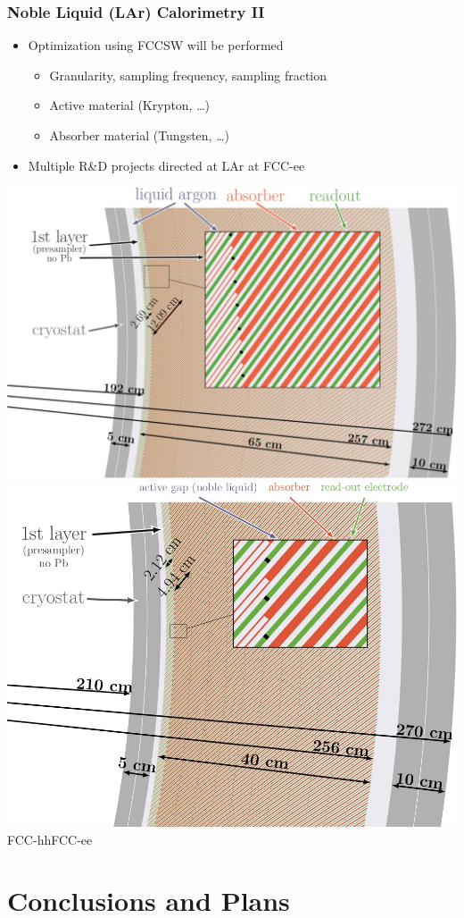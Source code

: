 \documentclass{beamer}
\begin{document}
\begin{frame}
  \frametitle{Noble Liquid (LAr) Calorimetry II}

  \begin{itemize}
    \item Optimization using FCCSW will be performed
          \begin{itemize}
            \item Granularity, sampling frequency, sampling fraction
            \item Active material (Krypton, \dots)
            \item Absorber material (Tungsten, \dots)
          \end{itemize}
    \item Multiple R\&D projects directed at LAr at FCC-ee
  \end{itemize}

  \includegraphics[align=c,width=0.47\linewidth]{figures/FCC_hh_LAr_diagram.png}%
  \hfill
  \includegraphics[align=c,width=0.47\linewidth]{figures/FCC_ee_LAr_diagram.png}\\[2ex]
  \hspace{6em}FCC-hh\hspace{11em}FCC-ee
\end{frame}


\section{Conclusions and Plans}
\end{document}
